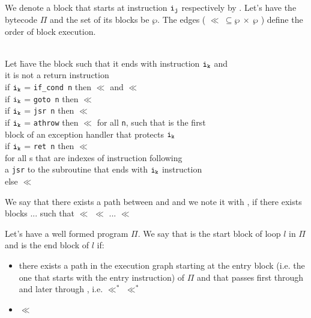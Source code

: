 We denote a block that starts at instruction $\tt{i_{j}}$
respectively by . Let's have the bytecode $\Pi$ and the
set of its blocks  be $\wp$. The edges ( $\ll \ \subseteq \wp \ \times \ \wp $ ) define the order of block execution.

\begin{defn}\label{execRel}
\begin{tabbing}
\\Let \=  have \= the block  such that  it ends with instruction $\tt{i_{k}}$ and \\
it is not a return instruction\\
\>  if $\tt{i_{k}}$ = \texttt{if\_cond n} then    $\ll$  and   $\ll $   \\
\>  if $\tt{i_{k}}$ = \texttt{goto n} then  $\ll$  \\
\>  if $\tt{i_{k}}$ = \texttt{jsr n} then  $\ll$  \\
\>  if $\tt{i_{k}}$ = \texttt{athrow} then  $\ll$  for all \texttt{n}, such that  is the first\\
\> \> block of an exception handler that protects $\tt{i_{k}}$ \\
\>  if  $\tt{i_{k}}$ = \texttt{ret n} then   $\ll$ \\
\> \> for all s that are indexes of instruction following \\
\> \> a \texttt{jsr} to the subroutine that ends with $\tt{i_{k}}$ instruction\\
\>  else  $ \ll  $ 
\end{tabbing}
\end{defn}
We say that there exists a path between  and  and we note it with  , if there exists blocks ...  such that $\ll$ $\ll$ ... $\ll$ 
\begin{defn}
\label{defLoop}
Let's have a well formed program $\Pi$. We say that  is the start block of loop $l$ in $\Pi$ and  is the end block of $l$ if:
\begin{itemize}
\item there exists a path in the execution graph starting at the entry block  (i.e. the one that starts with the entry instruction) of $\Pi$ and that passes first through  and later through , i.e. $\ll^{*}$  $\ll^{*}$ 
\item {} $\ll$ 
\end{itemize}
\end{defn}

